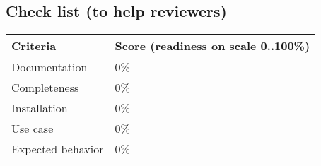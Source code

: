 \documentclass{sigplanconf}
\begin{document}
\subsection{Check list (to help reviewers)}

\begin{tabular}{|p{1.0in}|p{1.8in}|}
 \hline

 \textbf{Criteria} & \textbf{Score (readiness on scale 0..100\%)} \\

 \hline
 Documentation & 0\% \\

 \hline
 Completeness & 0\% \\

 \hline
 Installation & 0\% \\

 \hline
 Use case & 0\% \\

 \hline
 Expected behavior & 0\% \\

 \hline
\end{tabular}

\end{document}
